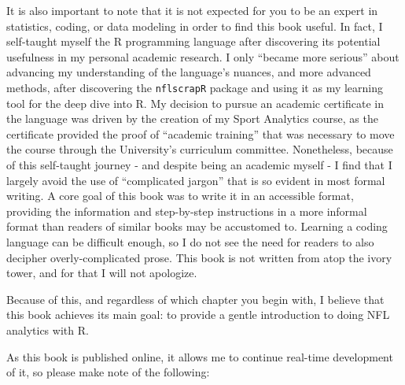 \documentclass[
  letterpaper,
]{krantz}
\begin{document}
It is also important to note that it is not expected for you to be an
expert in statistics, coding, or data modeling in order to find this
book useful. In fact, I self-taught myself the R programming language
after discovering its potential usefulness in my personal academic
research. I only ``became more serious'' about advancing my
understanding of the language's nuances, and more advanced methods,
after discovering the \texttt{nflscrapR} package and using it as my
learning tool for the deep dive into R. My decision to pursue an
academic certificate in the language was driven by the creation of my
Sport Analytics course, as the certificate provided the proof of
``academic training'' that was necessary to move the course through the
University's curriculum committee. Nonetheless, because of this
self-taught journey - and despite being an academic myself - I find that
I largely avoid the use of ``complicated jargon'' that is so evident in
most formal writing. A core goal of this book was to write it in an
accessible format, providing the information and step-by-step
instructions in a more informal format than readers of similar books may
be accustomed to. Learning a coding language can be difficult enough, so
I do not see the need for readers to also decipher overly-complicated
prose. This book is not written from atop the ivory tower, and for that
I will not apologize.

Because of this, and regardless of which chapter you begin with, I
believe that this book achieves its main goal: to provide a gentle
introduction to doing NFL analytics with R.

As this book is published online, it allows me to continue real-time
development of it, so please make note of the following:
\end{document}
